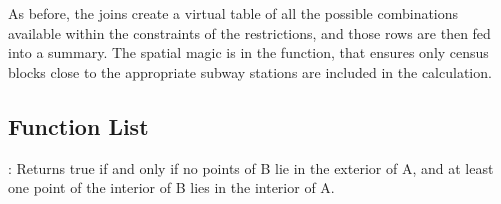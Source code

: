 \documentclass[a4paper,11pt,english]{sphinxmanual}
\begin{document}
\begin{sphinxVerbatim}[commandchars=\\\{\}]
                         
                         
                         
                         
                         
                          
                          
                           
                          
                          
                          
\end{sphinxVerbatim}

As before, the joins create a virtual table of all the possible combinations available within the constraints of the  restrictions, and those rows are then fed into a  summary. The spatial magic is in the  function, that ensures only census blocks close to the appropriate subway stations are included in the calculation.


\subsection{Function List}
\label{\detokenize{basic:id13}}
: Returns true if and only if no points of B lie in the exterior of A, and at least one point of the interior of B lies in the interior of A.
\end{document}

